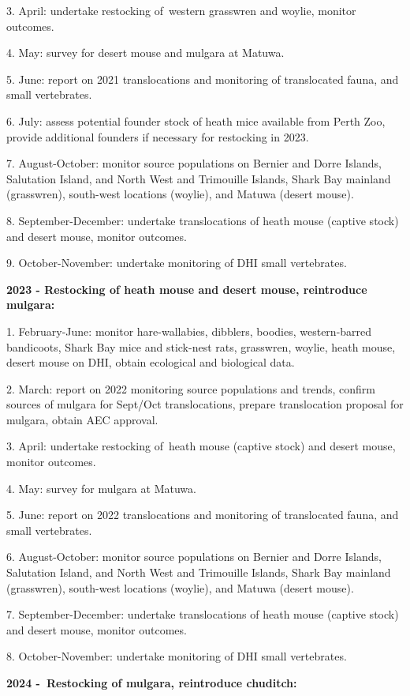 \documentclass[version=last,
    paper=a4,                               %
    10pt,                                   %
    dvipsnames,
    oneside,                              %
    headings=openany,                       %
    open=any,
    BCOR=7mm,                               %
    DIV=15,     %
]{scrbook}
\begin{document}
3. April: undertake restocking of~western grasswren and woylie, monitor
outcomes.

4. May: survey for desert mouse and mulgara at Matuwa.

5. June: report on 2021 translocations and monitoring of translocated
fauna, and small vertebrates.

6. July: assess potential founder stock of heath mice available from
Perth Zoo, provide additional founders if necessary for restocking in
2023.

7. August-October: monitor source populations on Bernier and Dorre
Islands, Salutation Island, and North West and Trimouille Islands, Shark
Bay mainland (grasswren), south-west locations (woylie), and Matuwa
(desert mouse).

8. September-December: undertake translocations of heath mouse (captive
stock) and desert mouse, monitor outcomes.

9. October-November: undertake monitoring of DHI small vertebrates.

\textbf{2023 - Restocking of heath mouse and desert mouse, reintroduce
mulgara:}

1. February-June: monitor hare-wallabies, dibblers, boodies,
western-barred bandicoots, Shark Bay mice and stick-nest rats,
grasswren, woylie, heath mouse, desert mouse on DHI, obtain ecological
and biological data.

2. March: report on 2022 monitoring source populations and trends,
confirm sources of mulgara for Sept/Oct translocations, prepare
translocation proposal for mulgara, obtain AEC approval.

3. April: undertake restocking of~heath mouse (captive stock) and desert
mouse, monitor outcomes.

4. May: survey for mulgara at Matuwa.

5. June: report on 2022 translocations and monitoring of translocated
fauna, and small vertebrates.

6. August-October: monitor source populations on Bernier and Dorre
Islands, Salutation Island, and North West and Trimouille Islands, Shark
Bay mainland (grasswren), south-west locations (woylie), and Matuwa
(desert mouse).

7. September-December: undertake translocations of heath mouse (captive
stock) and desert mouse, monitor outcomes.

8. October-November: undertake monitoring of DHI small vertebrates.

\textbf{2024 -~Restocking of mulgara, reintroduce chuditch:}
\end{document}
